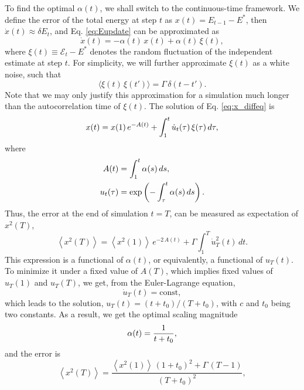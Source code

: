 \documentclass[preprint]{revtex4-1}
\begin{document}
To find the optimal $\alpha(t)$,
we shall switch to the continuous-time framework.
%
We define the error of the total energy at step $t$ as
$x(t) = E_{t-1} - E^*$,
then $\dot x(t) \approx \delta E_t$,
and Eq. \eqref{eq:Eupdate} can be approximated as
%
\begin{equation}
  \dot x(t)
  =
  -\alpha(t) \, x(t) + \alpha(t) \, \xi(t)
  ,
  \label{eq:x_diffeq}
\end{equation}
%
where $\xi(t) \equiv \mathcal E_t - E^*$
denotes the random fluctuation of the independent estimate at step $t$.
%
For simplicity, we will further approximate $\xi(t)$ as a white noise,
such that
\begin{equation}
  \langle \xi(t) \, \xi(t') \rangle = \Gamma \, \delta(t - t').
  \label{eq:noise_corr}
\end{equation}
%
Note that we may only justify this approximation
for a simulation much longer than the autocorrelation time of $\xi(t)$.
%
The solution of Eq. \eqref{eq:x_diffeq} is
%
\begin{equation}
  x(t)
  =
  x(1) \, e^{ -A(t) }
  +
  \int_1^t \dot u_t(\tau) \, \xi(\tau) \, d\tau
  ,
  \notag
\end{equation}
%
where
\begin{align*}
  A(t)
  &=
  \int_1^t \alpha(s) \, ds
  ,
\\
  u_t(\tau)
  &= \exp\left(
    -\int_\tau^t \alpha(s) \, ds
  \right)
  .
  \notag
\end{align*}
%
Thus, the error at the end of simulation $t = T$,
can be measured as expectation of $x^2(T)$,
%
\begin{equation}
  \left\langle
    x^2(T)
  \right\rangle
  =
  \left\langle
    x^2(1)
  \right\rangle
  \, e^{ -2 \, A(t) }
  +
  \Gamma
  \int_1^T
    \dot u_T^2(t) \, dt
  .
  \label{eq:err_functional}
\end{equation}
%
%
This expression is a functional of $\alpha(t)$,
or equivalently, a functional of $u_T(t)$.
%
To minimize it under a fixed value of $A(T)$,
which implies fixed values of $u_T(1)$ and $u_T(T)$,
we get, from the Euler-Lagrange equation,
$$
\dot u_T(t) = \mathrm{const},
$$
which leads to the solution,
$u_T(t) = (t + t_0) / (T + t_0)$,
with $c$ and $t_0$ being two constants.
%
As a result, we get the optimal scaling magnitude
%
\begin{equation}
  \alpha(t) = \frac{ 1 } { t + t_0 }
  ,
  \notag
\end{equation}
%
and the error is
%
$$%
  \left\langle
    x^2(T)
  \right\rangle
  =
  \frac{
    \left\langle x^2(1) \right\rangle
    \, (1 + t_0)^2
    + \Gamma \, (T - 1)
  }
  {
    (T + t_0)^2
  }
  ,
$$%
\end{document}
